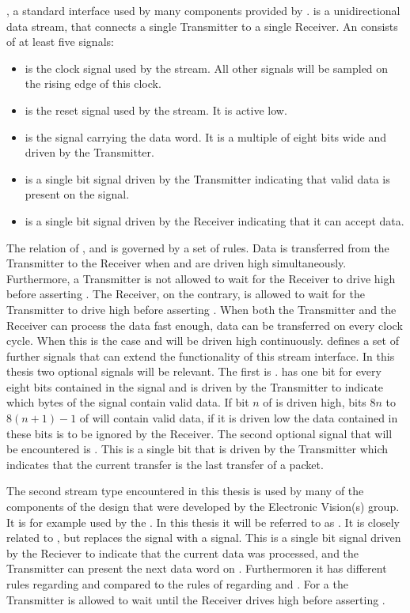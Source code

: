 \AXIStream{}\autocite{ref:axi_stream}, a standard interface used by many components provided by \Xilinx{}.
\AXIStream{} is a unidirectional data stream, that connects a single Transmitter to a single Receiver. An \AXIStream{} consists of at least five signals:
\begin{itemize}
    \item \ACLK{} is the clock signal used by the stream. All other signals will be sampled on the rising edge of this clock.
    \item \ARESETn{} is the reset signal used by the stream. It is active low.
    \item \TDATA{} is the signal carrying the data word. It is a multiple of eight bits wide and driven by the Transmitter.
    \item \TVALID{} is a single bit signal driven by the Transmitter indicating that valid data is present on the \TDATA{} signal.
    \item \TREADY{} is a single bit signal driven by the Receiver indicating that it can accept data.
\end{itemize}
The relation of \TDATA{}, \TVALID{} and \TREADY{} is governed by a set of rules.
Data is transferred from the Transmitter to the Receiver when \TREADY{} and \TVALID{} are driven high simultaneously.
Furthermore, a Transmitter is not allowed to wait for the Receiver to drive \TREADY{} high before asserting \TVALID{}. The Receiver, on the contrary, is allowed to wait for the Transmitter to drive \TVALID{} high before asserting \TREADY{}.
When both the Transmitter and the Receiver can process the data fast enough, data can be transferred on every clock cycle. When this is the case \TREADY{} and \TVALID{} will be driven high continuously.
\AXIStream{} defines a set of further signals that can extend the functionality of this stream interface. In this thesis two optional signals will be relevant.
The first is \TKEEP{}. \TKEEP{} has one bit for every eight bits contained in the \TDATA{} signal and is driven by the Transmitter to indicate which bytes of the \TDATA{} signal contain valid data.
If bit $n$ of \TKEEP{} is driven high, bits $8n$ to $8(n + 1) - 1$ of \TDATA{} will contain valid data, if it is driven low the data contained in these bits is to be ignored by the Receiver.
The second optional signal that will be encountered is \TLAST{}. This is a single bit that is driven by the Transmitter which indicates that the current transfer is the last transfer of a packet.

The second stream type encountered in this thesis is used by many of the components of the \FPGA{} design that were developed by the Electronic Vision(s) group. It is for example used by the \pbexec{}. In this thesis it will be referred to as \ValidNextStream{}. It is closely related to \AXIStream{}, but replaces the \TREADY{} signal with a \NEXT{} signal.
This is a single bit signal driven by the Reciever to indicate that the current data was processed, and the Transmitter can present the next data word on \TDATA{}. Furthermoren it has different rules regarding \TVALID{} and \NEXT{} compared to the rules of regarding \TVALID{} and \TREADY{}.
For a \ValidNextStream{} the Transmitter is allowed to wait until the Receiver drives \NEXT{} high before asserting \TVALID{}.

